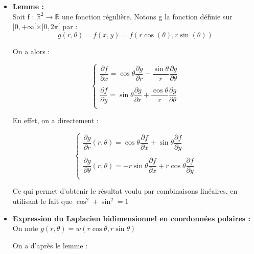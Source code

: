 \documentclass[a4,12pt]{article}
\newcommand{\R}{\mathbb{R}}
\begin{document}
		  \begin{itemize} 
		    \item \textbf{Lemme :}\\

		    Soit f : $\R^2 \rightarrow \R$ une fonction régulière. Notons g la fonction définie sur $]0,+\infty[ \times [0,2\pi[$ par :
		      \[
			g(r,\theta) = f(x,y) = f(r \cos(\theta), r \sin(\theta))
		      \]

		      On a alors :

		      \begin{equation*}{}
			\left\{
			  \begin{array}{rl}
			    \dfrac{\partial f}{\partial x} = \cos \theta \dfrac{\partial g}{\partial r} - \dfrac{\sin \theta}{r} \dfrac{\partial g}{\partial \theta}\\\\
			    \dfrac{\partial f}{\partial y} = \sin \theta \dfrac{\partial g}{\partial r} + \dfrac{\cos \theta}{r} \dfrac{\partial g}{\partial \theta}\\
			  \end{array}
			  \right.
			\end{equation*}


			En effet, on a directement :

			\begin{equation*}{}
			  \left\{
			    \begin{array}{l}
			      \dfrac{\partial g}{\partial r}(r,\theta) = \cos \theta \dfrac{\partial f}{\partial x} + \sin \theta \dfrac{\partial f}{\partial y}\\\\
			      \dfrac{\partial g}{\partial \theta}(r,\theta) = - r \sin \theta \dfrac{\partial f}{\partial x} + r \cos \theta \dfrac{\partial f}{\partial y}\\
			    \end{array}
			    \right.
			  \end{equation*}

			  Ce qui permet d'obtenir le résultat voulu par combinaisons linéaires, en utilisant le fait que $\cos^2 + \sin^2 = 1$ \\

			\item \textbf{Expression du Laplacien bidimensionnel en coordonnées polaires :}\\

			  On note $g(r,\theta) = w(r \cos \theta, r \sin \theta)$

			  On a d'après le lemme :


\end{itemize}
\end{document}
